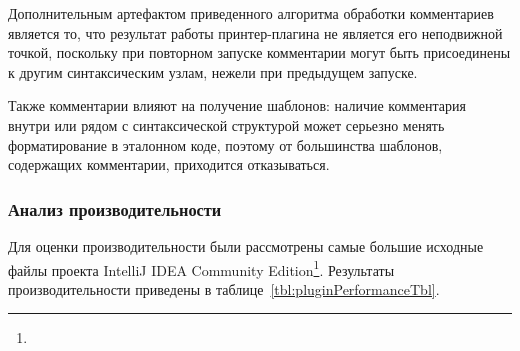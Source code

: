 Дополнительным артефактом приведенного алгоритма обработки комментариев является то,
что результат работы
принтер-плагина не является его неподвижной точкой, поскольку при повторном запуске
комментарии могут быть присоединены к другим синтаксическим узлам, нежели при предыдущем
запуске.

Также комментарии влияют на получение шаблонов:
наличие комментария внутри или рядом с синтаксической структурой
может серьезно менять форматирование в эталонном коде, поэтому от большинства
шаблонов, содержащих комментарии, приходится отказываться.

\newpage
\subsubsection{Анализ производительности}

Для оценки производительности были рассмотрены самые большие исходные файлы
проекта IntelliJ IDEA Community
Edition\footnote{}.
Результаты производительности приведены в
таблице~\ref{tbl:pluginPerformanceTbl}.

\begin{table}[h!]
	\centering



	\caption{Время форматирования файлов (в секундах)}
	\label{tbl:pluginPerformanceTbl}
\end{table}

